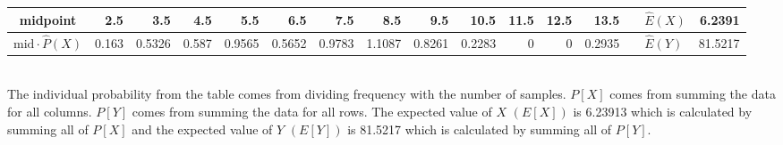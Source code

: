 \begin{table}[hb]
\begin{adjustbox}{width = \textwidth, center}
\begin{tabular}{|cc|r|r|r|r|r|r|r|r|r|r|r|r|r|r|r|}
            \multicolumn{2}{|c|}{\cellcolor[HTML]{FCE5CD}midpoint}                          & \cellcolor[HTML]{FCE5CD}2.5                    & \cellcolor[HTML]{FCE5CD}3.5                    & \cellcolor[HTML]{FCE5CD}4.5                    & \cellcolor[HTML]{FCE5CD}5.5                    & \cellcolor[HTML]{FCE5CD}6.5                    & \cellcolor[HTML]{FCE5CD}7.5                    & \cellcolor[HTML]{FCE5CD}8.5                    & \cellcolor[HTML]{FCE5CD}9.5                     & \cellcolor[HTML]{FCE5CD}10.5                    & \cellcolor[HTML]{FCE5CD}11.5                    & \cellcolor[HTML]{FCE5CD}12.5                    & \cellcolor[HTML]{FCE5CD}13.5                    & \multicolumn{1}{l|}{}                                                           & \multicolumn{1}{l|}{\cellcolor[HTML]{D9D9D9}$\widehat{E}(X)$}           & \cellcolor[HTML]{D9D9D9}6.2391                                                                   \\ \hline
            \multicolumn{2}{|c|}{\cellcolor[HTML]{FCE5CD}$\mathrm{mid}\cdot\widehat{P}(X)$} & \cellcolor[HTML]{FCE5CD}0.163                  & \cellcolor[HTML]{FCE5CD}0.5326                 & \cellcolor[HTML]{FCE5CD}0.587                  & \cellcolor[HTML]{FCE5CD}0.9565                 & \cellcolor[HTML]{FCE5CD}0.5652                 & \cellcolor[HTML]{FCE5CD}0.9783                 & \cellcolor[HTML]{FCE5CD}1.1087                 & \cellcolor[HTML]{FCE5CD}0.8261                  & \cellcolor[HTML]{FCE5CD}0.2283                  & \cellcolor[HTML]{FCE5CD}0                       & \cellcolor[HTML]{FCE5CD}0                       & \cellcolor[HTML]{FCE5CD}0.2935                  & \multicolumn{1}{l|}{}                                                           & \multicolumn{1}{l|}{\cellcolor[HTML]{D9D9D9}$\widehat{E}(Y)$}           & \cellcolor[HTML]{D9D9D9}81.5217                                                                  \\ \hline
        \end{tabular}
    \end{adjustbox}
\end{table}\\
\noindent The individual probability from the table comes from dividing frequency with the number of samples. $P[X]$ comes from summing the data for all columns. $P[Y]$ comes from summing the data for all rows. The expected value of $X$ $(E[X])$ is 6.23913 which is calculated by summing all of $P[X]$ and the expected value of $Y$ $(E[Y])$ is 81.5217 which is calculated by summing all of $P[Y]$.\\
